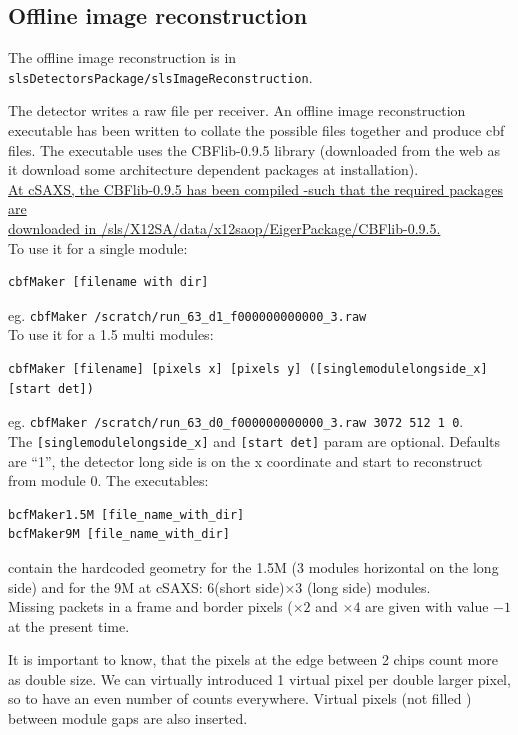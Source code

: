 \documentclass{article}
\begin{document}
\subsection{Offline image reconstruction}
The offline image reconstruction is in {\tt{slsDetectorsPackage/slsImageReconstruction}}.

The detector writes a raw file per receiver. An offline image reconstruction executable has been written to collate the possible files together and produce cbf files. The executable uses the CBFlib-0.9.5 library (downloaded from the web as it download some architecture dependent packages at installation).\\
\underline{At cSAXS, the CBFlib-0.9.5 has been compiled -such that the required packages are}\\\underline{ downloaded in /sls/X12SA/data/x12saop/EigerPackage/CBFlib-0.9.5.}\\ 

To use it for a single module:
\begin{verbatim}
cbfMaker [filename with dir]
\end{verbatim}
eg.
{\tt{cbfMaker /scratch/run\_63\_d1\_f000000000000\_3.raw}}\\

To use it for a 1.5 multi modules:
\begin{verbatim}
cbfMaker [filename] [pixels x] [pixels y] ([singlemodulelongside_x] [start det])
\end{verbatim}
eg.
{\tt cbfMaker /scratch/run\_63\_d0\_f000000000000\_3.raw  3072 512 1 0}.\\
The {\tt{[singlemodulelongside\_x]}} and {\tt{[start det]}} param are optional. Defaults are ``1'', the detector long side is on the x coordinate and start to reconstruct from module 0. 
The executables: 
\begin{verbatim}
bcfMaker1.5M [file_name_with_dir]
bcfMaker9M [file_name_with_dir]
\end{verbatim}
contain the hardcoded geometry for the 1.5M (3 modules horizontal on the long side) and for the 9M at cSAXS: 6(short side)$\times$3 (long side) modules.\\ 
Missing packets in a frame and border pixels ($\times 2$ and $\times 4$ are given with value $-1$ at the present time.

It is important to know, that the pixels at the edge between 2 chips count more as double size. We can virtually introduced 1 virtual pixel per double larger pixel, so to have an even number of counts everywhere. Virtual pixels (not filled ) between module gaps are also inserted.
\end{document}
